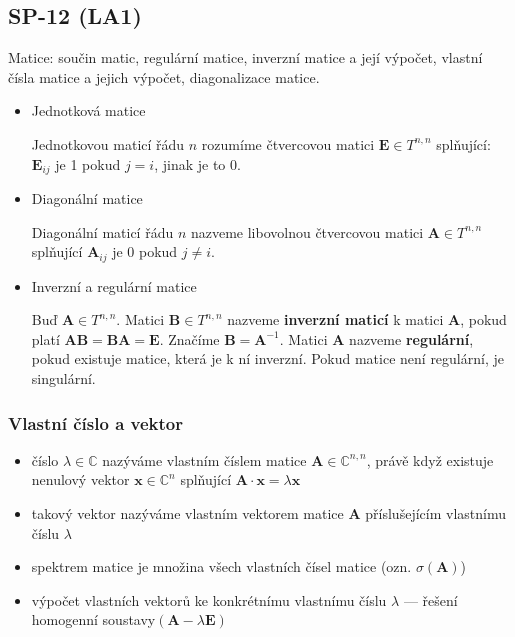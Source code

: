 \subsection{SP-12 (LA1)}
Matice: součin matic, regulární matice, inverzní matice a její výpočet, vlastní čísla matice a jejich výpočet, diagonalizace matice.

\begin{itemize}
	\item Jednotková matice
	
	Jednotkovou maticí řádu $n$ rozumíme čtvercovou matici $\textbf{E} \in T^{n,n}$ splňující: $\textbf{E}_{ij}$ je 1 pokud $j=i$, jinak je to 0.
	
	\item Diagonální matice
	
	Diagonální maticí řádu $n$ nazveme libovolnou čtvercovou matici $\textbf{A} \in T^{n,n}$ splňující $\textbf{A}_{ij}$ je 0 pokud $j \neq i$.
	
	\item Inverzní a regulární matice
	
	Buď $\textbf{A} \in T^{n,n}$. Matici $\textbf{B} \in T^{n,n}$ nazveme \textbf{inverzní maticí} k matici $\textbf{A}$, pokud platí $\textbf{AB} = \textbf{BA} = \textbf{E}$. Značíme $\textbf{B} = \textbf{A}^{-1}$. Matici $\textbf{A}$ nazveme \textbf{regulární}, pokud existuje matice, která je k ní inverzní. Pokud matice není regulární, je singulární.
\end{itemize}

\subsubsection*{Vlastní číslo a vektor}
\begin{itemize}
	\item číslo $\lambda \in \mathbb{C}$ nazýváme vlastním číslem matice $\textbf{A} \in \mathbb{C}^{n,n}$, právě když existuje nenulový vektor $\textbf{x} \in \mathbb{C}^n$ splňující $\textbf{A} \cdot \textbf{x} = \lambda\textbf{x}$
	\item takový vektor nazýváme vlastním vektorem matice $\textbf{A}$ příslušejícím vlastnímu číslu $\lambda$
	\item spektrem matice je množina všech vlastních čísel matice (ozn. $\sigma(\textbf{A})$)
	
	\item výpočet vlastních vektorů ke konkrétnímu vlastnímu číslu $\lambda$ --- řešení homogenní soustavy$(\textbf{A} - \lambda \textbf{E})$
\end{itemize}

